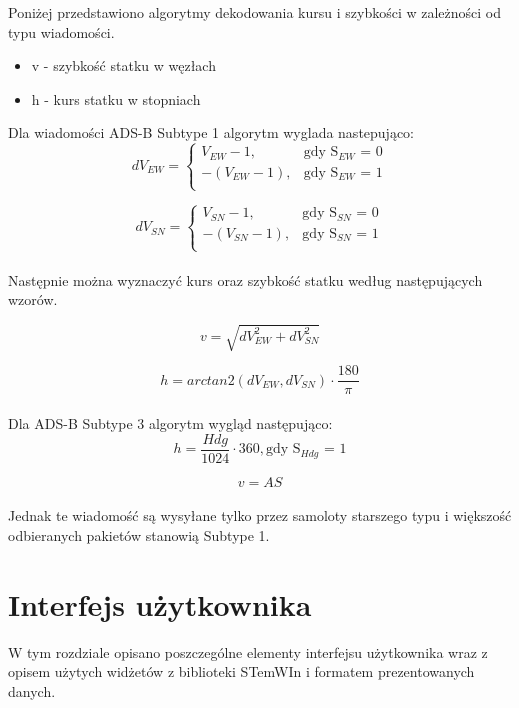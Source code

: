 \documentclass[eng,printmode]{mgr}
\begin{document}
Poniżej przedstawiono algorytmy dekodowania kursu i szybkości w zależności od typu wiadomości.
\begin{itemize}
\item v - szybkość statku w węzłach
\item h - kurs statku w stopniach
\end{itemize}

\noindent
Dla wiadomości ADS-B Subtype 1 algorytm wyglada nastepująco:
\begin{equation}
\renewcommand*{\arraystretch}{1.3}
dV_{EW}= \left\{ \begin{array}{ll}
V_{EW} - 1, & \textrm{gdy S$_{EW}$ = 0}\\
-(V_{EW} - 1), & \textrm{gdy S$_{EW}$ = 1}\\
\end{array} \right.
\end{equation}

\begin{equation}
\renewcommand*{\arraystretch}{1.3}
dV_{SN}= \left\{ \begin{array}{ll}
V_{SN} - 1, & \textrm{gdy S$_{SN}$ = 0}\\
-(V_{SN} - 1), & \textrm{gdy S$_{SN}$ = 1}\\
\end{array} \right.
\end{equation}
\\
\noindent
Następnie można wyznaczyć kurs oraz szybkość statku według następujących wzorów.

\begin{equation}
v = \sqrt{dV_{EW}^2 + dV_{SN}^2}
\end{equation}

\begin{equation}
h = arctan2(dV_{EW},dV_{SN}) \cdot \frac{180}{\pi}
\end{equation}
\\
\noindent
Dla ADS-B Subtype 3 algorytm wygląd następująco:
\begin{equation}
h = \frac{Hdg}{1024} \cdot 360, \textrm{gdy S$_{Hdg}$ = 1}
\end{equation}

\begin{equation}
v = AS
\end{equation}
\\
Jednak te wiadomość są wysyłane tylko przez samoloty starszego typu i większość odbieranych pakietów stanowią Subtype 1.

\chapter{Interfejs użytkownika}
W tym rozdziale opisano poszczególne elementy interfejsu użytkownika wraz z opisem użytych widżetów z biblioteki STemWIn i formatem prezentowanych danych.
\\
\end{document}
